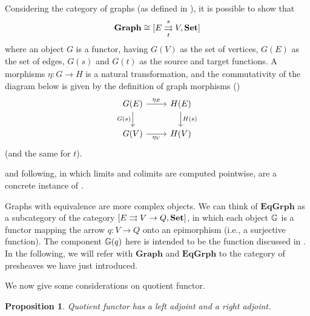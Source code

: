 \documentclass[a4paper, twoside,openright]{report}
\theoremstyle{plain}
\newtheorem{prop}[theorem]{Proposition}
\theoremstyle{definition}
\begin{document}
Considering the category of graphs (as defined in ), it is possible to show that 
$$\mathbf{Graph} \cong [E \mathrel{\mathop{\rightrightarrows}^{s}_{t}} V , \mathbf{Set}]$$
where an object $G$ is a functor, having $G(V)$ as the set of vertices, $G(E)$ as the set of edges, $G(s)$ and $G(t)$ as the source and target functions. A morphisms $\eta: G \dot\rightarrow H$ is a natural transformation, and the commutativity of the diagram below is given by the definition of graph morphisms ()
$$
    \begin{tikzcd}
        G(E) \arrow[r, "{\eta_E}"] \arrow[d, "G(s)"swap] & H(E) \arrow[d, "H(s)"] \\
        G(V) \arrow[r, "{\eta_V}"swap] & H(V)
    \end{tikzcd}
$$
(and the same for $t$).

 and following, in which limits and colimits are computed pointwise, are a concrete instance of .

Graphs with equivalence are more complex objects. We can think of $\mathbf{EqGrph}$ as a subcategory of the category $[E \rightrightarrows V \rightarrow Q, \mathbf{Set}]$, in which each object $\mathbb{G}$ is a functor mapping the arrow $q: V \rightarrow Q$ onto an epimorphism (i.e., a surjective function). The component $\mathbb{G}(q)$ here is intended to be the function discussed in .
In the following, we will refer with $\mathbf{Graph}$ and $\mathbf{EqGrph}$ to the category of presheaves we have just introduced.

We now give some considerations on quotient functor.

\begin{prop}
    Quotient functor has a left adjoint and a right adjoint.
\end{prop}
\end{document}
